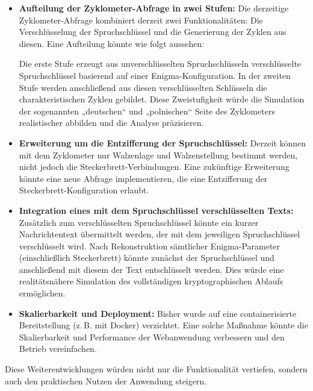 \documentclass[12pt, ngerman, a4paper, numbers=noenddot]{article}
\begin{document}
\begin{itemize}
	\item \textbf{Aufteilung der Zyklometer-Abfrage in zwei Stufen:}  
	Die derzeitige Zyklometer-Abfrage kombiniert derzeit zwei Funktionalitäten: Die Verschlüsselung der Spruchschlüssel und die Generierung der Zyklen aus diesen. Eine Aufteilung könnte wie folgt aussehen:
	
	Die erste Stufe erzeugt aus unverschlüsselten Spruchschlüsseln verschlüsselte Spruchschlüssel basierend auf einer Enigma-Konfiguration. In der zweiten Stufe werden anschließend aus diesen verschlüsselten Schlüsseln die charakteristischen Zyklen gebildet. Diese Zweistufigkeit würde die Simulation der sogenannten „deutschen“ und „polnischen“ Seite des Zyklometers realistischer abbilden und die Analyse präzisieren.
	
	\item \textbf{Erweiterung um die Entzifferung der Spruchschlüssel:}  
	Derzeit können mit dem Zyklometer nur Walzenlage und Walzenstellung bestimmt werden, nicht jedoch die Steckerbrett-Verbindungen. Eine zukünftige Erweiterung könnte eine neue Abfrage implementieren, die eine Entzifferung der Steckerbrett-Konfiguration erlaubt.
	
	\item \textbf{Integration eines mit dem Spruchschlüssel verschlüsselten Texts:}  
	Zusätzlich zum verschlüsselten Spruchschlüssel könnte ein kurzer Nachrichtentext übermittelt werden, der mit dem jeweiligen Spruchschlüssel verschlüsselt wird. Nach Rekonstruktion sämtlicher Enigma-Parameter (einschließlich Steckerbrett) könnte zunächst der Spruchschlüssel und anschließend mit diesem der Text entschlüsselt werden. Dies würde eine realitätsnähere Simulation des vollständigen kryptographischen Ablaufs ermöglichen.
	
	\item \textbf{Skalierbarkeit und Deployment:}  
	Bisher wurde auf eine containerisierte Bereitstellung (z.\,B. mit Docker) verzichtet. Eine solche Maßnahme könnte die Skalierbarkeit und Performance der Webanwendung verbessern und den Betrieb vereinfachen.
\end{itemize}

Diese Weiterentwicklungen würden nicht nur die Funktionalität vertiefen, sondern auch den praktischen Nutzen der Anwendung steigern.
\end{document}
